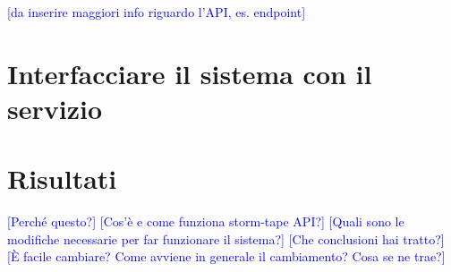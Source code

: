 \textcolor{blue}{[da inserire maggiori info riguardo l'API, es. endpoint]}

\section{Interfacciare il sistema con il servizio}
\section{Risultati}


\textcolor{blue}{[Perché questo?]}
\textcolor{blue}{[Cos'è e come funziona storm-tape API?]}
\textcolor{blue}{[Quali sono le modifiche necessarie per far funzionare il sistema?]}
\textcolor{blue}{[Che conclusioni hai tratto?]}
\textcolor{blue}{[È facile cambiare? Come avviene in generale il cambiamento? Cosa se ne trae?]}

